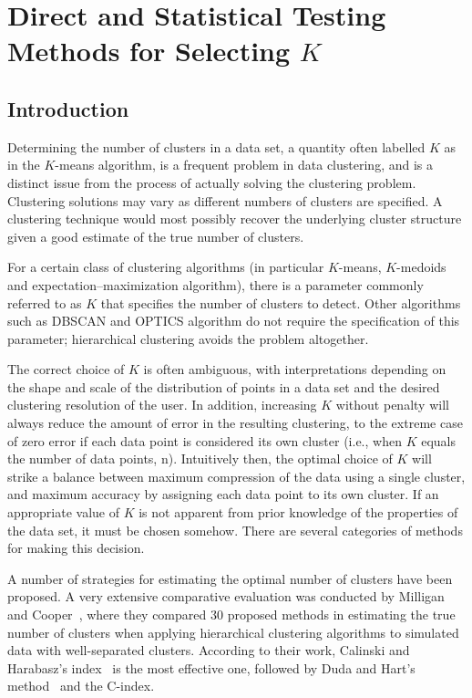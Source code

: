 \chapter{Direct and Statistical Testing Methods for Selecting $K$}\label{mywork}

\section{Introduction}
Determining the number of clusters in a data set, a quantity often labelled $K$ as in the $K$-means algorithm,
is a frequent problem in data clustering, and is a distinct issue from the process of actually solving the
clustering problem. Clustering solutions may vary as different numbers of clusters are specified.
A clustering technique would most possibly recover the underlying cluster structure given a good
estimate of the true number of clusters.

For a certain class of clustering algorithms (in particular $K$-means, $K$-medoids and expectation–maximization algorithm),
there is a parameter commonly referred to as $K$ that specifies the number of clusters to detect. Other algorithms such
as DBSCAN and OPTICS algorithm do not require the specification of this parameter; hierarchical clustering avoids the
problem altogether.

The correct choice of $K$ is often ambiguous, with interpretations depending on the shape and scale of the distribution
of points in a data set and the desired clustering resolution of the user. In addition, increasing $K$ without penalty
will always reduce the amount of error in the resulting clustering, to the extreme case of zero error if each data point
is considered its own cluster (i.e., when $K$ equals the number of data points, n). Intuitively then, the optimal choice
of $K$ will strike a balance between maximum compression of the data using a single cluster, and maximum accuracy by
assigning each data point to its own cluster. If an appropriate value of $K$ is not apparent from prior knowledge of the
properties of the data set, it must be chosen somehow. There are several categories of methods for making this decision.

A number of strategies for estimating the optimal number of clusters have been proposed.
A very extensive comparative evaluation was conducted by Milligan and Cooper~\cite{milligan85},
where they compared 30 proposed methods in estimating the true number of clusters
when applying hierarchical clustering algorithms to simulated data with well-separated clusters.
According to their work, Calinski and Harabasz’s index~\cite{Calinski1974} is the most effective one,
followed by Duda and Hart’s method~\cite{Hart73} and the C-index.

